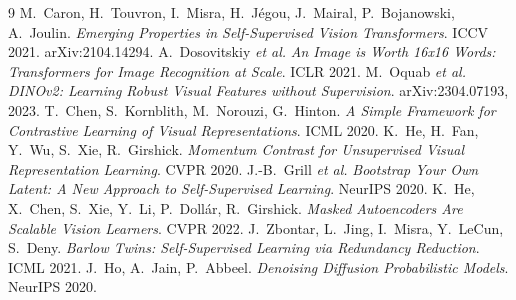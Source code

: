 \documentclass[11pt,a4paper]{article}
\begin{document}
\begin{thebibliography}{9}
M.~Caron, H.~Touvron, I.~Misra, H.~Jégou, J.~Mairal, P.~Bojanowski, A.~Joulin.
\emph{Emerging Properties in Self-Supervised Vision Transformers}. ICCV 2021. arXiv:2104.14294.
A.~Dosovitskiy \emph{et al.}
\emph{An Image is Worth 16x16 Words: Transformers for Image Recognition at Scale}. ICLR 2021.
M.~Oquab \emph{et al.} \emph{DINOv2: Learning Robust Visual Features without Supervision}.
arXiv:2304.07193, 2023.
T.~Chen, S.~Kornblith, M.~Norouzi, G.~Hinton.
\emph{A Simple Framework for Contrastive Learning of Visual Representations}. ICML 2020.
K.~He, H.~Fan, Y.~Wu, S.~Xie, R.~Girshick.
\emph{Momentum Contrast for Unsupervised Visual Representation Learning}. CVPR 2020.
J.-B.~Grill \emph{et al.}
\emph{Bootstrap Your Own Latent: A New Approach to Self-Supervised Learning}. NeurIPS 2020.
K.~He, X.~Chen, S.~Xie, Y.~Li, P.~Dollár, R.~Girshick.
\emph{Masked Autoencoders Are Scalable Vision Learners}. CVPR 2022.
J.~Zbontar, L.~Jing, I.~Misra, Y.~LeCun, S.~Deny.
\emph{Barlow Twins: Self-Supervised Learning via Redundancy Reduction}. ICML 2021.
J.~Ho, A.~Jain, P.~Abbeel.
\emph{Denoising Diffusion Probabilistic Models}. NeurIPS 2020.
\end{thebibliography}
\end{document}
